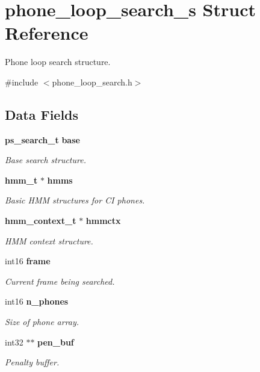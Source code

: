 \section{phone\+\_\+loop\+\_\+search\+\_\+s Struct Reference}
\label{structphone__loop__search__s}


Phone loop search structure.  




{\ttfamily \#include $<$phone\+\_\+loop\+\_\+search.\+h$>$}

\subsection*{Data Fields}
\begin{DoxyCompactItemize}
\item 
\textbf{ ps\+\_\+search\+\_\+t} \textbf{ base}
\begin{DoxyCompactList}\small\item\em Base search structure. \end{DoxyCompactList}\item 
\textbf{ hmm\+\_\+t} $\ast$ \textbf{ hmms}
\begin{DoxyCompactList}\small\item\em Basic H\+MM structures for CI phones. \end{DoxyCompactList}\item 
\textbf{ hmm\+\_\+context\+\_\+t} $\ast$ \textbf{ hmmctx}
\begin{DoxyCompactList}\small\item\em H\+MM context structure. \end{DoxyCompactList}\item 
int16 \textbf{ frame}
\begin{DoxyCompactList}\small\item\em Current frame being searched. \end{DoxyCompactList}\item 
int16 \textbf{ n\+\_\+phones}
\begin{DoxyCompactList}\small\item\em Size of phone array. \end{DoxyCompactList}\item 
\mbox{\label{structphone__loop__search__s_ad9233a565738a5097097bab89193e2c5}} 
int32 $\ast$$\ast$ \textbf{ pen\+\_\+buf}
\begin{DoxyCompactList}\small\item\em Penalty buffer. \end{DoxyCompactList}\item 
$$
\end{DoxyCompactItemize}
